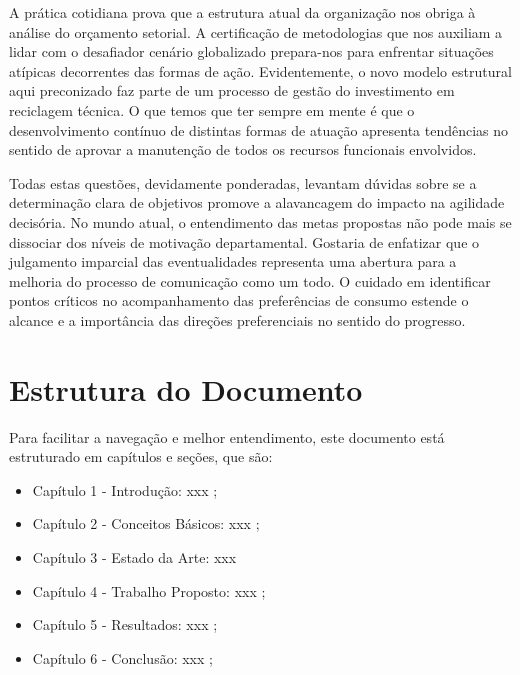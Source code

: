 A prática cotidiana prova que a estrutura atual da organização nos obriga à análise do orçamento setorial. A certificação de metodologias que nos auxiliam a lidar com o desafiador cenário globalizado prepara-nos para enfrentar situações atípicas decorrentes das formas de ação. Evidentemente, o novo modelo estrutural aqui preconizado faz parte de um processo de gestão do investimento em reciclagem técnica. O que temos que ter sempre em mente é que o desenvolvimento contínuo de distintas formas de atuação apresenta tendências no sentido de aprovar a manutenção de todos os recursos funcionais envolvidos.

Todas estas questões, devidamente ponderadas, levantam dúvidas sobre se a determinação clara de objetivos promove a alavancagem do impacto na agilidade decisória. No mundo atual, o entendimento das metas propostas não pode mais se dissociar dos níveis de motivação departamental. Gostaria de enfatizar que o julgamento imparcial das eventualidades representa uma abertura para a melhoria do processo de comunicação como um todo. O cuidado em identificar pontos críticos no acompanhamento das preferências de consumo estende o alcance e a importância das direções preferenciais no sentido do progresso.

\section{Estrutura do Documento}

Para facilitar a navegação e melhor entendimento, este documento está
estruturado em capítulos e seções, que são:
\begin{itemize}
\item {Capítulo 1 - Introdução}: xxx \cite{Yu:2004:ESG:1015090.1015207};
\item {Capítulo 2 - Conceitos Básicos}: xxx \cite{Cormen:2009};
\item {Capítulo 3 - Estado da Arte}: xxx \cite{Weicker:1984:DSS:358274.358283}
\item {Capítulo 4 - Trabalho Propost}o: xxx \cite{IEEE_802_11:6178212};
\item {Capítulo 5 - Resultados}: xxx \cite{Linux:402081};
\item {Capítulo 6 - Conclusão}: xxx \cite{SBC:2012};
\end{itemize}
